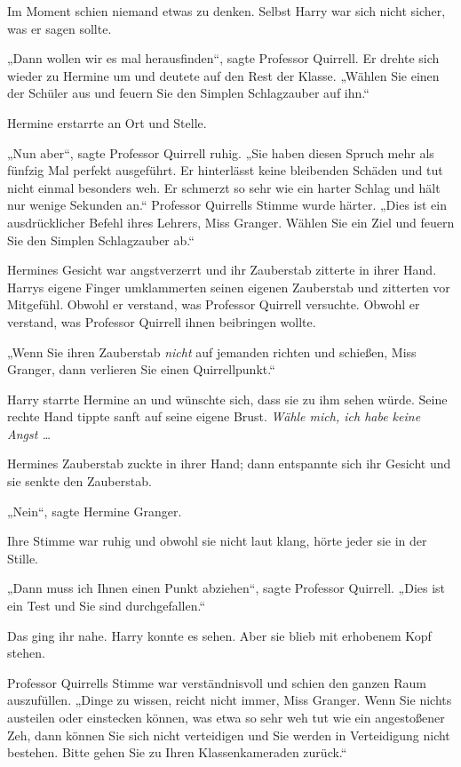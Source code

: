 {Im Moment schien niemand etwas zu denken. Selbst Harry war sich nicht sicher, was er sagen sollte.

„Dann wollen wir es mal herausfinden“, sagte Professor Quirrell. Er drehte sich wieder zu Hermine um und deutete auf den Rest der Klasse. „Wählen Sie einen der Schüler aus und feuern Sie den Simplen Schlagzauber auf ihn.“

Hermine erstarrte an Ort und Stelle.

„Nun aber“, sagte Professor Quirrell ruhig. „Sie haben diesen Spruch mehr als fünfzig Mal perfekt ausgeführt. Er hinterlässt keine bleibenden Schäden und tut nicht einmal besonders weh. Er schmerzt so sehr wie ein harter Schlag und hält nur wenige Sekunden an.“ Professor Quirrells Stimme wurde härter. „Dies ist ein ausdrücklicher Befehl ihres Lehrers, Miss Granger. Wählen Sie ein Ziel und feuern Sie den Simplen Schlagzauber ab.“

Hermines Gesicht war angstverzerrt und ihr Zauberstab zitterte in ihrer Hand. Harrys eigene Finger umklammerten seinen eigenen Zauberstab und zitterten vor Mitgefühl. Obwohl er verstand, was Professor Quirrell versuchte. Obwohl er verstand, was Professor Quirrell ihnen beibringen wollte.

„Wenn Sie ihren Zauberstab \emph{nicht} auf jemanden richten und schießen, Miss Granger, dann verlieren Sie einen Quirrellpunkt.“

Harry starrte Hermine an und wünschte sich, dass sie zu ihm sehen würde. Seine rechte Hand tippte sanft auf seine eigene Brust. \emph{Wähle mich, ich habe keine Angst …}

Hermines Zauberstab zuckte in ihrer Hand; dann entspannte sich ihr Gesicht und sie senkte den Zauberstab.

„Nein“, sagte Hermine Granger.

Ihre Stimme war ruhig und obwohl sie nicht laut klang, hörte jeder sie in der Stille.

„Dann muss ich Ihnen einen Punkt abziehen“, sagte Professor Quirrell. „Dies ist ein Test und Sie sind durchgefallen.“

Das ging ihr nahe. Harry konnte es sehen. Aber sie blieb mit erhobenem Kopf stehen.

Professor Quirrells Stimme war verständnisvoll und schien den ganzen Raum auszufüllen. „Dinge zu wissen, reicht nicht immer, Miss Granger. Wenn Sie nichts austeilen oder einstecken können, was etwa so sehr weh tut wie ein angestoßener Zeh, dann können Sie sich nicht verteidigen und Sie werden in Verteidigung nicht bestehen. Bitte gehen Sie zu Ihren Klassenkameraden zurück.“

}
